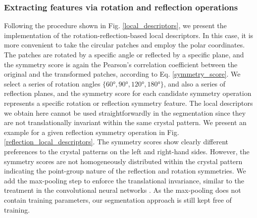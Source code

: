 \documentclass[twocolumn,amsmath, floatfix]{revtex4}
\begin{document}
\subsubsection{Extracting features via rotation and reflection operations}
Following the procedure shown in Fig. \ref{local_descriptors}, we present the implementation of the rotation-reflection-based local descriptors.  In this case, it is more convenient to take the circular patches and employ the polar coordinates. The patches are rotated by a specific angle or reflected by a specific plane, and the symmetry score is again the Pearson's correlation coefficient between the original and the transformed patches, according to Eq. \eqref{symmetry_score}. We select a series of rotation angles $\{\ang{60}, \ang{90}, \ang{120},\ang{180}\}$, and also a series of reflection planes, and the symmetry score for each candidate symmetry operation represents a specific rotation or reflection symmetry feature.
The local descriptors we obtain here cannot be used straightforwardly in the segmentation since they are not translationally invariant within the same crystal pattern.  We present an example for a given reflection symmetry operation in Fig. \ref{reflection_local_descriptors}. The symmetry scores show clearly different preferences to the crystal patterns on the left and right-hand sides.  However, the symmetry scores are not homogeneously distributed within the crystal pattern indicating the point-group nature of the reflection and rotation symmetries. 
We add the max-pooling step to enforce the translational invariance, similar to the treatment in the convolutional neural networks \cite{Lecun2010}. As the max-pooling does not contain training parameters, our segmentation approach is still kept free of training.
\end{document}
